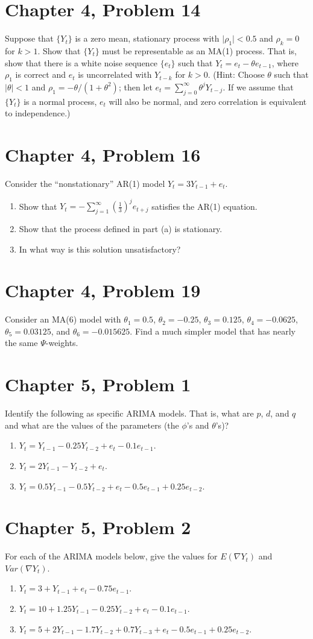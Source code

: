 \documentclass[11pt]{article}
\newif\ifclearpage
\newcommand{\problem}[1]{\section*{#1}}
\newcommand{\solution}{\hrulefill}
\newcommand{\maybeclearpage}{\ifclearpage\clearpage\fi}
\begin{document}
\problem{Chapter 4, Problem 14}
Suppose that $\{Y_t\}$ is a zero mean, stationary process with $\mid \rho_1 \mid < 0.5$ and $\rho_k = 0$ for $k > 1$. Show that $\{Y_t\}$ must be representable as an MA(1) process. That is, show that there is a white noise sequence $\{e_t\}$ such that $Y_t = e_t - \theta e_{t-1}$, where $\rho_1$ is correct and $e_t$ is uncorrelated with $Y_{t-k}$ for $k > 0$. (Hint: Choose $\theta$ such that $\mid \theta \mid < 1$ and $\rho_1 = -\theta/(1+\theta^2)$; then let $e_t = \sum_{j=0}^{\infty} \theta^jY_{t-j}$. If we assume that $\{Y_t\}$ is a normal process, $e_t$ will also be normal, and zero correlation is equivalent to independence.)

\solution


\maybeclearpage
\problem{Chapter 4, Problem 16}
Consider the ``nonstationary'' AR(1) model $Y_t = 3Y_{t-1} + e_t$.
\begin{enumerate}
	\item Show that $Y_t = - \sum_{j=1}^{\infty} \left( \frac{1}{3} \right)^j e_{t+j}$ satisfies the AR(1) equation.
	\item Show that the process defined in part (a) is stationary.
	\item In what way is this solution unsatisfactory?
\end{enumerate}

\solution


\maybeclearpage
\problem{Chapter 4, Problem 19}
Consider an MA(6) model with $\theta_1 = 0.5$, $\theta_2 = -0.25$, $\theta_3 = 0.125$, $\theta_4 = -0.0625$, $\theta_5 = 0.03125$, and $\theta_6 = -0.015625$. Find a much simpler model that has nearly the same $\Psi$-weights.

\solution

\maybeclearpage
\problem{Chapter 5, Problem 1}
Identify the following as specific ARIMA models. That is, what are $p$, $d$, and $q$ and what are the values of the parameters (the $\phi$'s and $\theta$'s)?
\begin{enumerate}
	\item $Y_t = Y_{t-1} - 0.25Y_{t-2} + e_t - 0.1e_{t-1}$.
	\item $Y_t = 2Y_{t-1} - Y_{t-2} + e_t$.
	\item $Y_t = 0.5Y_{t-1} - 0.5Y_{t-2} + e_t - 0.5e_{t-1} + 0.25e_{t-2}$.
\end{enumerate}

\solution


\maybeclearpage
\problem{Chapter 5, Problem 2}
For each of the ARIMA models below, give the values for $E(\nabla Y_t)$ and $Var(\nabla Y_t)$.
\begin{enumerate}
	\item $Y_t = 3 + Y_{t-1} + e_t - 0.75e_{t-1}$.
	\item $Y_t = 10 + 1.25Y_{t-1} - 0.25Y_{t-2} + e_t - 0.1e_{t-1}$.
	\item $Y_t = 5 + 2Y_{t-1} - 1.7Y_{t-2} + 0.7Y_{t-3} + e_t - 0.5e_{t-1} + 0.25e_{t-2}$.
\end{enumerate}
\end{document}
